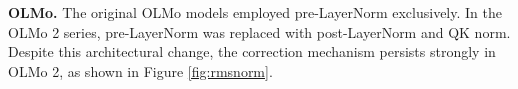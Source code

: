 \textbf{OLMo.} The original OLMo models employed pre-LayerNorm exclusively. In the OLMo 2 series, pre-LayerNorm was replaced with post-LayerNorm and QK norm. Despite this architectural change, the correction mechanism persists strongly in OLMo 2, as shown in Figure \ref{fig:rmsnorm}.


